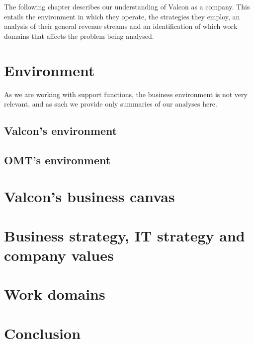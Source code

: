 The following chapter describes our understanding of Valcon as a company. This entails the environment in which they operate, the strategies they employ, an analysis of their general revenue streams and an identification of which work domains that affects the problem being analysed.

\section{Environment}
As we are working with support functions, the business environment is not very relevant, and as such we provide only summaries of our analyses here.
\subsection{Valcon's environment}

\subsection{OMT's environment}

\section{Valcon's business canvas}

\section{Business strategy, IT strategy and company values}

\section{Work domains}

\section{Conclusion}

